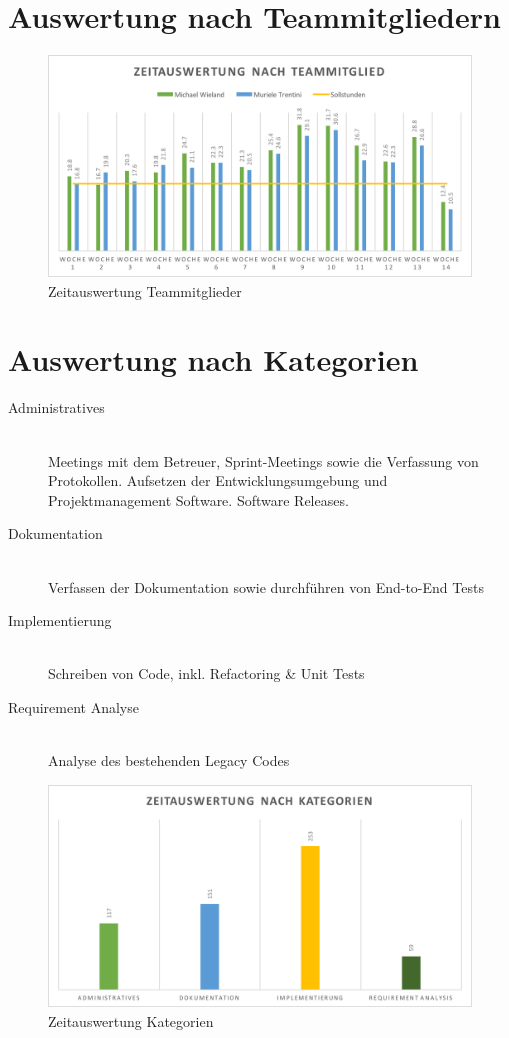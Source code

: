 \documentclass[11pt,a4paper,english,oneside]{book}
\numberwithin{equation}{chapter}
\begin{document}
	\section{Auswertung nach Teammitgliedern}
	\begin{figure}[h!]
		\centering
		\includegraphics[width=\linewidth]{assets/images/zeitauswertung-team}
		\caption{Zeitauswertung Teammitglieder}
		\label{zeitauswertung-team}
	\end{figure}
	
	\section{Auswertung nach Kategorien}
	\begin{description}
		\item[Administratives] \hfill \\ 
		Meetings mit dem Betreuer, Sprint-Meetings sowie die Verfassung von Protokollen. Aufsetzen der Entwicklungsumgebung und Projektmanagement Software. Software Releases.
		\item[Dokumentation] \hfill \\ 
		Verfassen der Dokumentation sowie durchführen von End-to-End Tests
		\item[Implementierung] \hfill \\ 
		Schreiben von Code, inkl. Refactoring \& Unit Tests
		\item[Requirement Analyse] \hfill \\ 
		Analyse des bestehenden Legacy Codes
	\end{description}
	\begin{figure}[h!]
		\centering
		\includegraphics[width=\linewidth]{assets/images/zeitauswertung-kat}
		\caption{Zeitauswertung Kategorien}
		\label{zeitauswertung-kategorien}
	\end{figure}
	
\end{document}
